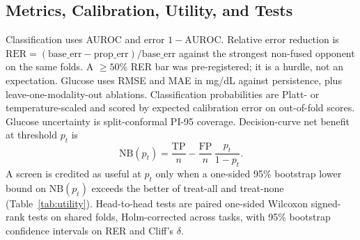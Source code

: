 \subsection{Metrics, Calibration, Utility, and Tests}
\label{sec:stats}

Classification uses AUROC and error $1-\mathrm{AUROC}$. Relative error reduction is
$\mathrm{RER}=(\mathrm{base\_err}-\mathrm{prop\_err})/\mathrm{base\_err}$ against the strongest
non-fused opponent on the same folds. A $\ge 50\%$ RER bar was pre-registered; it is a hurdle,
not an expectation. Glucose uses RMSE and MAE in mg/dL against persistence, plus
leave-one-modality-out ablations. Classification probabilities are Platt- or temperature-scaled
and scored by expected calibration error on out-of-fold scores. Glucose uncertainty is
split-conformal PI-95 coverage. Decision-curve net benefit~\cite{vickers2006dca} at threshold
$p_t$ is
\begin{equation}
\mathrm{NB}(p_t) = \frac{\mathrm{TP}}{n} - \frac{\mathrm{FP}}{n}\,\frac{p_t}{1-p_t}.
\end{equation}
A screen is credited as useful at $p_t$ only when a one-sided 95\% bootstrap lower bound on
$\mathrm{NB}(p_t)$ exceeds the better of treat-all and treat-none (Table~\ref{tab:utility}).
Head-to-head tests are paired one-sided Wilcoxon signed-rank tests on shared folds, Holm-corrected
across tasks, with 95\% bootstrap confidence intervals on RER and Cliff's $\delta$.
